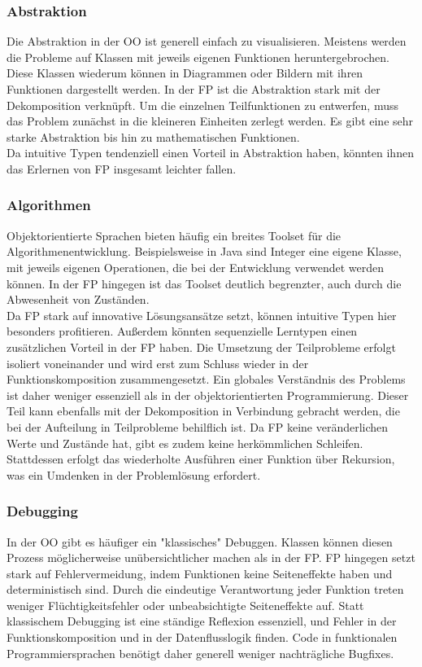 \subsubsection{Abstraktion}
Die Abstraktion in der OO ist generell einfach zu visualisieren. Meistens werden die Probleme auf Klassen mit jeweils eigenen Funktionen heruntergebrochen. Diese Klassen wiederum können in Diagrammen oder Bildern mit ihren Funktionen dargestellt werden.
In der FP ist die Abstraktion stark mit der Dekomposition verknüpft. Um die einzelnen Teilfunktionen zu entwerfen, muss das Problem zunächst in die kleineren Einheiten zerlegt werden.
Es gibt eine sehr starke Abstraktion bis hin zu mathematischen Funktionen.
\\
Da intuitive Typen tendenziell einen Vorteil in Abstraktion haben, könnten ihnen das Erlernen von FP insgesamt leichter fallen.

\subsubsection{Algorithmen}
Objektorientierte Sprachen bieten häufig ein breites Toolset für die Algorithmenentwicklung. Beispielsweise in Java sind Integer eine eigene Klasse, mit jeweils eigenen Operationen, die bei der Entwicklung verwendet werden können. In der FP hingegen ist das Toolset deutlich begrenzter, auch durch die Abwesenheit von Zuständen.
\\
Da FP stark auf innovative Lösungsansätze setzt, können intuitive Typen hier besonders profitieren.
Außerdem könnten sequenzielle Lerntypen einen zusätzlichen Vorteil in der FP haben. Die Umsetzung der Teilprobleme erfolgt isoliert voneinander und wird erst zum Schluss wieder in der Funktionskomposition zusammengesetzt. Ein globales Verständnis des Problems ist daher weniger essenziell als in der objektorientierten Programmierung. Dieser Teil kann ebenfalls mit der Dekomposition in Verbindung gebracht werden, die bei der Aufteilung in Teilprobleme behilflich ist.
Da FP keine veränderlichen Werte und Zustände hat, gibt es zudem keine herkömmlichen Schleifen. Stattdessen erfolgt das wiederholte Ausführen einer Funktion über Rekursion, was ein Umdenken in der Problemlösung erfordert.

\subsubsection{Debugging}
In der OO gibt es häufiger ein "klassisches" Debuggen. Klassen können diesen Prozess möglicherweise unübersichtlicher machen als in der FP. FP hingegen setzt stark auf Fehlervermeidung, indem Funktionen keine Seiteneffekte haben und deterministisch sind. Durch die eindeutige Verantwortung jeder Funktion treten weniger Flüchtigkeitsfehler oder unbeabsichtigte Seiteneffekte auf. Statt klassischem Debugging ist eine ständige Reflexion essenziell, und Fehler in der Funktionskomposition und in der Datenflusslogik finden.
Code in funktionalen Programmiersprachen benötigt daher generell weniger nachträgliche Bugfixes.

